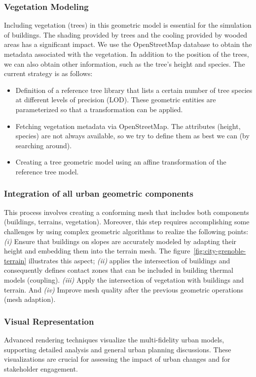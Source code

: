 \documentclass[runningheads]{llncs}
\begin{document}
\subsubsection{Vegetation Modeling}
Including vegetation (trees) in this geometric model is essential for the simulation of buildings. The shading provided by trees and the cooling provided by wooded areas has a significant impact. 
We use the OpenStreetMap database to obtain the metadata associated with the vegetation. In addition to the position of the trees, we can also obtain other information, such as the tree's height and species. The current strategy is as follows:
\begin{itemize}
\item Definition of a reference tree library that lists a certain number of tree species at different levels of precision (LOD). These geometric entities are parameterized so that a transformation can be applied.
\item Fetching vegetation metadata via OpenStreetMap. The attributes (height, species) are not always available, so we try to define them as best we can (by searching around).
\item Creating a tree geometric model using an affine transformation of the reference tree model.
\end{itemize}

\subsubsection{Integration of all urban geometric components}
This process involves creating a conforming mesh that includes both components (buildings, terrains, vegetation). Moreover, this step requires accomplishing some challenges by using complex geometric algorithms to realize the following points: \textit{(i)} Ensure that buildings on slopes are accurately modeled by adapting their height and embedding them into the terrain mesh. The figure~\ref{fig:city-grenoble-terrain} illustrates this aspect; \textit{(ii)} applies the intersection of buildings and consequently defines contact zones that can be included in building thermal models (coupling). \textit{(iii)} Apply the intersection of vegetation with buildings and terrain. 
And \textit{(iv)} Improve mesh quality after the previous geometric operations (mesh adaption).

\subsubsection{Visual Representation}
Advanced rendering techniques visualize the multi-fidelity urban models, supporting detailed analysis and general urban planning discussions. 
These visualizations are crucial for assessing the impact of urban changes and for stakeholder engagement.
\end{document}
